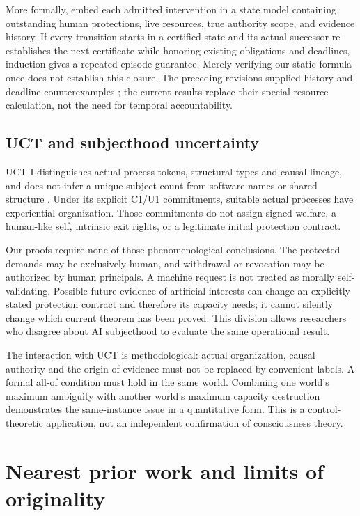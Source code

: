 More formally, embed each admitted intervention in a state model containing outstanding human protections, live resources, true authority scope, and evidence history. If every transition starts in a certified state and its actual successor re-establishes the next certificate while honoring existing obligations and deadlines, induction gives a repeated-episode guarantee. Merely verifying our static formula once does not establish this closure. The preceding revisions supplied history and deadline counterexamples \cite{liu5}; the current results replace their special resource calculation, not the need for temporal accountability.

\subsection{UCT and subjecthood uncertainty}
UCT I distinguishes actual process tokens, structural types and causal lineage, and does not infer a unique subject count from software names or shared structure \cite{uct}. Under its explicit C1/U1 commitments, suitable actual processes have experiential organization. Those commitments do not assign signed welfare, a human-like self, intrinsic exit rights, or a legitimate initial protection contract.

Our proofs require none of those phenomenological conclusions. The protected demands may be exclusively human, and withdrawal or revocation may be authorized by human principals. A machine request is not treated as morally self-validating. Possible future evidence of artificial interests can change an explicitly stated protection contract and therefore its capacity needs; it cannot silently change which current theorem has been proved. This division allows researchers who disagree about AI subjecthood to evaluate the same operational result.

The interaction with UCT is methodological: actual organization, causal authority and the origin of evidence must not be replaced by convenient labels. A formal all-of condition must hold in the same world. Combining one world's maximum ambiguity with another world's maximum capacity destruction demonstrates the same-instance issue in a quantitative form. This is a control-theoretic application, not an independent confirmation of consciousness theory.

\section{Nearest prior work and limits of originality}
